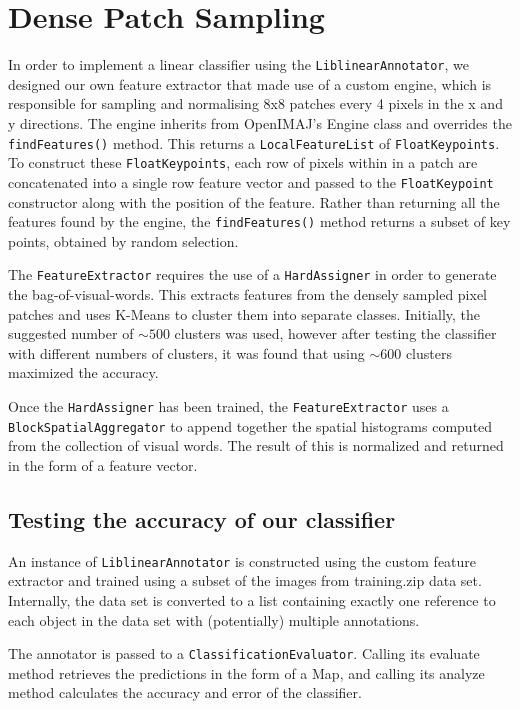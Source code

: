 \documentclass[a4paper]{article}
\begin{document}
\section{Dense Patch Sampling}
In order to implement a linear classifier using the \texttt{LiblinearAnnotator}, we designed our own feature extractor that made use of a custom engine, which is responsible for sampling and normalising 8x8 patches every 4 pixels in the x and y directions. The engine inherits from OpenIMAJ’s Engine class and overrides the \texttt{findFeatures()} method. This returns a \texttt{LocalFeatureList} of \texttt{FloatKeypoints}. To construct these \texttt{FloatKeypoints}, each row of pixels within in a patch are concatenated into a single row feature vector and passed to the \texttt{FloatKeypoint} constructor along with the position of the feature. Rather than returning all the features found by the engine, the \texttt{findFeatures()} method returns a subset of key points, obtained by random selection.

The \texttt{FeatureExtractor} requires the use of a \texttt{HardAssigner} in order to generate the bag-of-visual-words. This extracts features from the densely sampled pixel patches and uses K-Means to cluster them into separate classes. Initially, the suggested number of $\sim500$ clusters was used, however after testing the classifier with different numbers of clusters, it was found that using $\sim600$ clusters maximized the accuracy.

Once the \texttt{HardAssigner} has been trained, the \texttt{FeatureExtractor} uses a  \texttt{BlockSpatialAggregator} to append together the spatial histograms computed from the collection of visual words. The result of this is normalized and returned in the form of a feature vector.

\subsection{Testing the accuracy of our classifier}
An instance of \texttt{LiblinearAnnotator} is constructed using the custom feature extractor and trained using a subset of the images from training.zip data set. Internally, the data set is converted to a list containing exactly one reference to each object in the data set with (potentially) multiple annotations. 

The annotator is passed to a \texttt{ClassificationEvaluator}. Calling its evaluate method retrieves the predictions in the form of a Map, and calling its analyze method calculates the accuracy and error of the classifier.
\end{document}
